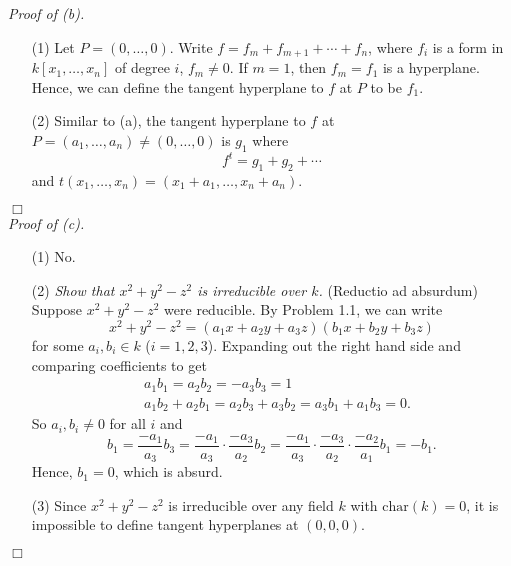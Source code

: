 \documentclass{article}
\begin{document}
\emph{Proof of (b).}
\begin{enumerate}
\item[(1)]
  Let $P = (0,\ldots,0)$.
  Write $f = f_m + f_{m+1} + \cdots + f_n$,
  where $f_i$ is a form in $k[x_1,\ldots,x_n]$ of degree $i$, $f_m \neq 0$.
  If $m = 1$, then $f_m = f_1$ is a hyperplane.
  Hence, we can define the tangent hyperplane to $f$ at $P$ to be $f_1$.

\item[(2)]
  Similar to (a),
  the tangent hyperplane to $f$ at $P = (a_1,\ldots,a_n) \neq (0,\ldots,0)$ is $g_1$
  where
  \[
    f^t = g_1 + g_2 + \cdots
  \]
  and $t(x_1,\ldots,x_n) = (x_1+a_1,\ldots,x_n+a_n)$.
\end{enumerate}
$\Box$ \\



\emph{Proof of (c).}
\begin{enumerate}
\item[(1)]
  No.

\item[(2)]
  \emph{Show that $x^2 + y^2 - z^2$ is irreducible over $k$.}
  (Reductio ad absurdum)
  Suppose $x^2 + y^2 - z^2$ were reducible.
  By Problem 1.1, we can write
  \[
    x^2 + y^2 - z^2 = (a_1 x + a_2 y + a_3 z)(b_1 x + b_2 y + b_3 z)
  \]
  for some $a_i, b_i \in k$ ($i = 1, 2, 3$).
  Expanding out the right hand side and comparing coefficients to get
  \begin{align*}
    & a_1 b_1 = a_2 b_2 = -a_3 b_3 = 1 \\
    & a_1 b_2 + a_2 b_1 = a_2 b_3 + a_3 b_2 = a_3 b_1 + a_1 b_3 = 0.
  \end{align*}
  So $a_i, b_i \neq 0$ for all $i$ and
  \[
    b_1
    = \frac{-a_1}{a_3} b_3
    = \frac{-a_1}{a_3} \cdot \frac{-a_3}{a_2} b_2
    = \frac{-a_1}{a_3} \cdot \frac{-a_3}{a_2} \cdot \frac{-a_2}{a_1} b_1 = -b_1.
  \]
  Hence, $b_1 = 0$, which is absurd.

\item[(3)]
  Since $x^2 + y^2 - z^2$ is irreducible over any field $k$ with $\mathrm{char}(k) = 0$,
  it is impossible to define tangent hyperplanes at $(0,0,0)$.
\end{enumerate}
$\Box$ \\\\



\end{document}
